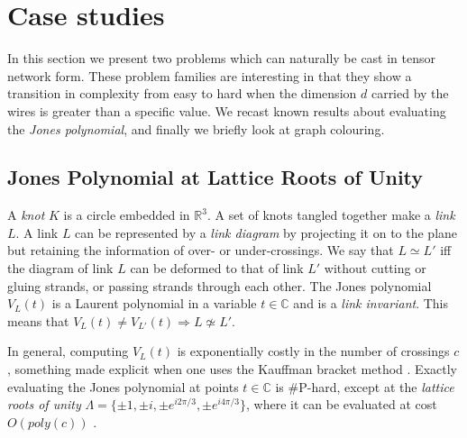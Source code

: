 \section{Case studies}

In this section we present two problems which can naturally be cast in tensor network form.
These problem families are interesting in that they show a transition in complexity from easy to hard when the dimension $d$ carried by the wires is greater than a specific value. We recast known results about evaluating the \emph{Jones polynomial}, and finally we briefly look at graph colouring.

\subsection{Jones Polynomial at Lattice Roots of Unity}


A \emph{knot} $K$ is a circle embedded in $\mathbb{R}^3$.
A set of knots tangled together make a \emph{link} $L$.
A link $L$ can be represented by a \emph{link diagram}
by projecting it on to the plane
but retaining the information of over- or under-crossings.
We say that $L\simeq L'$ iff the diagram of link $L$ can be deformed to that of link $L'$ without cutting or gluing strands, or passing strands through each other.
The Jones polynomial $V_L(t)$
is a Laurent polynomial in a variable $t\in\mathbb{C}$
and is a \emph{link invariant}.
This means that
$V_L(t)\neq V_{L'}(t)\Rightarrow L\not\simeq L'$.

In general, computing $V_L(t)$
is exponentially costly in the number of crossings $c$,
something made explicit when one uses the Kauffman bracket method \cite{Kauffman2001}.
Exactly evaluating the Jones polynomial at points $t\in\mathbb{C}$ is \#P-hard,
except at the \emph{lattice roots of unity} $\Lambda = \{ \pm 1, \pm i, \pm e^{i 2\pi/3}, \pm e^{i 4\pi/3} \}$,
where it can be evaluated at cost $O(poly(c))$ \cite{jaeger_vertigan_welsh_1990}.



